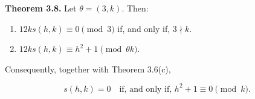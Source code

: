 \textbf{Theorem 3.8.}
Let $\theta = (3, k)$. Then:
\begin{enumerate}
\item[(a)] $12ks(h, k) \equiv 0 \pmod{3}$ if, and only if, $3 \nmid k$.
\item[(b)] $12ks(h, k) \equiv h^2 + 1 \pmod{\theta k}$.
\end{enumerate}
Consequently, together with Theorem 3.6(c),

$$
s(h, k) = 0 \quad \text{if, and only if, } h^2 + 1 \equiv 0 \pmod{k}.
$$
